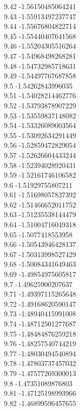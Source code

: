 {9.42	-1.56150485064241\\
9.43	-1.55913497237747\\
9.44	-1.55676804822714\\
9.45	-1.55440407641568\\
9.46	-1.55204305516264\\
9.47	-1.54968498268281\\
9.48	-1.54732985718631\\
9.49	-1.54497767687858\\
9.5	-1.54262843996035\\
9.51	-1.54028214462776\\
9.52	-1.53793878907229\\
9.53	-1.53559837148082\\
9.54	-1.53326089003564\\
9.55	-1.53092634291449\\
9.56	-1.52859472829054\\
9.57	-1.52626604433244\\
9.58	-1.52394028920431\\
9.59	-1.52161746106582\\
9.6	-1.51929755807211\\
9.61	-1.51698057837392\\
9.62	-1.51466652011752\\
9.63	-1.51235538144479\\
9.64	-1.51004716049318\\
9.65	-1.5077418553958\\
9.66	-1.50543946428137\\
9.67	-1.50313998527429\\
9.68	-1.50084341649463\\
9.69	-1.49854975605817\\
9.7	-1.49625900207637\\
9.71	-1.49397115265648\\
9.72	-1.49168620590147\\
9.73	-1.48940415991008\\
9.74	-1.48712501277687\\
9.75	-1.48484876259218\\
9.76	-1.48257540744219\\
9.77	-1.48030494540894\\
9.78	-1.47803737457032\\
9.79	-1.47577269300013\\
9.8	-1.47351089876803\\
9.81	-1.47125198993966\\
9.82	-1.46899596457655\\
}

